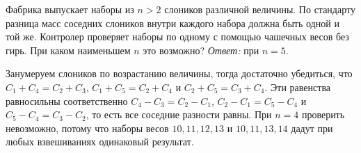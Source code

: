 \problem
Фабрика выпускает наборы из $n > 2$ слоников различной величины.
По стандарту разница масс соседних слоников внутри каждого набора должна быть
одной и той же.
Контролер проверяет наборы по одному с помощью чашечных весов без гирь.
При каком наименьшем $n$ это возможно?
\solution
\emph{Ответ:} при $n = 5$.
\par
Занумеруем слоников по возрастанию величины, тогда достаточно убедиться, что
$C_1 + C_4 = C_2 + C_3$, $C_1 + C_5 = C_2 + C_4$ и $C_2 + C_5 = C_3 + C_4$.
Эти равенства равносильны соответственно $C_4 - C_3 = C_2 - C_1$,
$C_2 - C_1 = C_5 - C_4$ и $C_5 - C_4 = C_3 - C_2$, то есть все соседние
разности равны.
При $n = 4$ проверить невозможно, потому что наборы весов $10, 11, 12, 13$ и
$10, 11, 13, 14$ дадут при любых взвешиваниях одинаковый результат.
\endproblem
